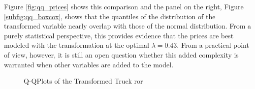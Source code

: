 \documentclass[11pt]{book}
\begin{document}
Figure \ref{fig:qq_prices} shows this comparison
and the panel on the right, Figure \ref{subfig:qq_boxcox}, 
shows that the quantiles of the distribution of the transformed variable
nearly overlap with those of the normal distribution.
From a purely statistical perspective, 
this provides evidence that the prices are best modeled with the transformation
at the optimal $\lambda = 0.43$.
From a practical point of view, however, 
it is still an open question whether this 
added complexity is warranted when other variables are added to the model. 


\begin{figure}[!ht]
\hfill
{}

\caption{Q-QPlots of the Transformed Truck ror}
\label{fig:qq_ror}
\end{figure}








\end{document}
